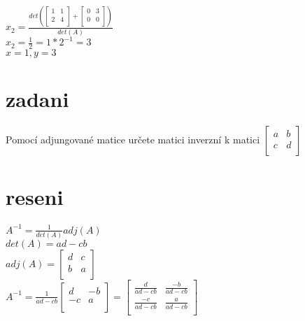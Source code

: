 \documentclass[a4paper]{article}
\begin{document}
$
x_2 = \frac{det\left(
	\left[ \begin{matrix} 
		1 & 1 \\
		2 & 4 \\
	\end{matrix} \right] + 
	\left[ \begin{matrix} 
		0 & 3 \\
		0 & 0 \\
	\end{matrix} \right]
\right)}{
	det(A)
}
$\\
$
x_2 = \frac{1}{2} = 1*2^{-1} = 3
$\\
$x = 1, y = 3$






\section*{zadani}
Pomocí adjungované matice určete matici inverzní k matici
$
\left[ \begin{matrix} 
	a & b \\
	c & d \\
\end{matrix} \right]
$



\section*{reseni}
$A^{-1} = \frac{1}{det(A)}adj(A)$\\
$det(A) = ad-cb$\\
$adj(A) = 
\left[ \begin{matrix} 
	d & c \\
	b & a \\
\end{matrix} \right]
$\\
$
A^{-1} = 
\frac{1}{ad-cb}
\left[ \begin{matrix} 
	d & -b \\
	-c & a \\
\end{matrix} \right] =
\left[ \begin{matrix} 
	\frac{d}{ad-cb} & \frac{-b}{ad-cb} \\
	\frac{-c}{ad-cb} & \frac{a}{ad-cb} \\
\end{matrix} \right]
$
\end{document}
